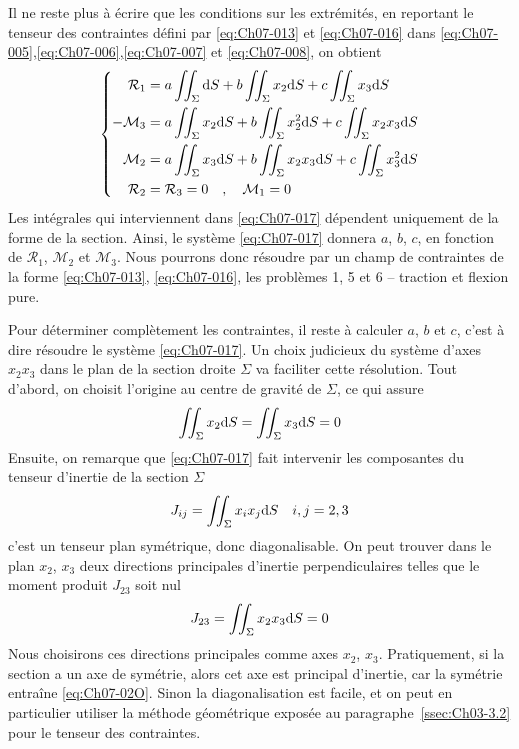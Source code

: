 Il ne reste plus à écrire que les conditions sur les extrémités, en reportant le tenseur des contraintes défini par \eqref{eq:Ch07-013} et \eqref{eq:Ch07-016} dans \eqref{eq:Ch07-005},\eqref{eq:Ch07-006},\eqref{eq:Ch07-007} et \eqref{eq:Ch07-008}, on obtient
\begin{equation}
    \left\{
    \begin{aligned}
        \mathcal{R}_1 &= a \iint_{\Sigma} \mathrm{d} S + b \iint_{\Sigma} x_2 \mathrm{d} S + c \iint_{\Sigma} x_3 \mathrm{d} S \\
        -\mathcal{M}_3 &= a \iint_{\Sigma} x_2\mathrm{d} S + b \iint_{\Sigma} x_2^2 \mathrm{d} S + c \iint_{\Sigma} x_2 x_3 \mathrm{d} S \\
        \mathcal{M}_2 &= a \iint_{\Sigma} x_3 \mathrm{d} S + b \iint_{\Sigma} x_2 x_3 \mathrm{d} S + c \iint_{\Sigma} x_3^2 \mathrm{d} S \\
        \mathcal{R}_2 &= \mathcal{R}_3 = 0 \quad, \quad \mathcal{M}_1 = 0
    \end{aligned}
    \right.
    \label{eq:Ch07-017}
\end{equation}
Les intégrales qui interviennent dans \eqref{eq:Ch07-017} dépendent uniquement de la forme de la section.
Ainsi, le système \eqref{eq:Ch07-017} donnera $a$, $b$, $c$, en fonction de $\mathcal{R}_1$, $\mathcal{M}_2$ et $\mathcal{M}_3$.
Nous pourrons donc résoudre par un champ de contraintes de la forme \eqref{eq:Ch07-013}, \eqref{eq:Ch07-016}, les problèmes 1, 5 et 6 -- traction et flexion pure.

Pour déterminer complètement les contraintes, il reste à calculer $a$, $b$ et $c$, c'est à dire résoudre le système \eqref{eq:Ch07-017}.
Un choix judicieux du système d'axes $x_2x_3$ dans le plan de la section droite $\Sigma$ va faciliter cette résolution.
Tout d'abord, on choisit l'origine au centre de gravité de $\Sigma$, ce qui assure
\begin{equation}
    \iint_{\Sigma} x_2 \mathrm{d} S = \iint_{\Sigma} x_3 \mathrm{d} S = 0
    \label{eq:Ch07-018}
\end{equation}
Ensuite, on remarque que \eqref{eq:Ch07-017} fait intervenir les composantes du tenseur d'inertie de la section $\Sigma$
\begin{equation}
    J_{ij} = \iint_{\Sigma} x_i x_j \mathrm{d} S \quad i,j = 2,3
    \label{eq:Ch07-019}
\end{equation}
c'est un tenseur plan symétrique, donc diagonalisable.
On peut trouver dans le plan $x_2$, $x_3$ deux directions principales d'inertie perpendiculaires telles que le moment produit $J_{23}$ soit nul
\begin{equation}
    J_{23} = \iint_{\Sigma} x_2 x_3 \mathrm{d} S = 0
    \label{eq:Ch07-020}
\end{equation}
Nous choisirons ces directions principales comme axes $x_2$, $x_3$.
Pratiquement, si la section a un axe de symétrie, alors cet axe est principal d'inertie, car la symétrie entraîne \eqref{eq:Ch07-02O}.
Sinon la diagonalisation est facile, et on peut en particulier utiliser la méthode géométrique exposée au paragraphe~\ref{ssec:Ch03-3.2} pour le tenseur des contraintes.

